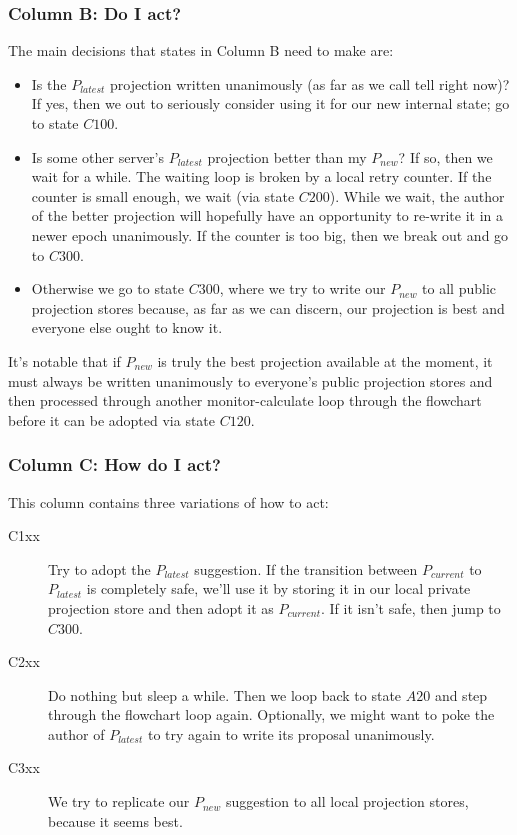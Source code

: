 \documentclass[preprint,10pt]{sigplanconf}
\begin{document}
\subsubsection{Column B: Do I act?}

The main decisions that states in Column B need to make are:

\begin{itemize}

\item Is the $P_{latest}$ projection written unanimously (as far as we
  call tell right now)?  If yes, then we out to seriously consider
  using it for our new internal state; go to state $C100$.

\item Is some other server's $P_{latest}$ projection better than my
  $P_{new}$?  If so,
  then we wait for a while.  The waiting loop is broken by a local
  retry counter.  If the counter is small enough, we wait (via state
  $C200$).  While we wait, the author of the better projection will
  hopefully have an opportunity to re-write it in a newer epoch
  unanimously.  If the counter is too big, then we break out and go to
  $C300$.

\item Otherwise we go to state $C300$, where we try to write our
  $P_{new}$ to all public projection stores because, as far as we can
  discern, our projection is best and everyone else ought to know it.

\end{itemize}

It's notable that if $P_{new}$ is truly the best projection available
at the moment, it must always be written unanimously to everyone's
public projection stores and then processed through another
monitor-calculate loop through the flowchart before it can be adopted
via state $C120$.

\subsubsection{Column C: How do I act?}

This column contains three variations of how to act:

\begin{description}

\item[C1xx] Try to adopt the $P_{latest}$ suggestion.  If the transition
  between $P_{current}$ to $P_{latest}$ is completely safe, we'll use
  it by storing it in our local private projection store and then
  adopt it as $P_{current}$.  If it isn't safe, then jump to $C300$.

\item[C2xx] Do nothing but sleep a while.  Then we loop back to state
  $A20$ and step through the flowchart loop again.  Optionally, we
  might want to poke the author of $P_{latest}$ to try again to write
  its proposal unanimously.

\item[C3xx] We try to replicate our $P_{new}$ suggestion to all local
  projection stores, because it seems best.

\end{description}
\end{document}
